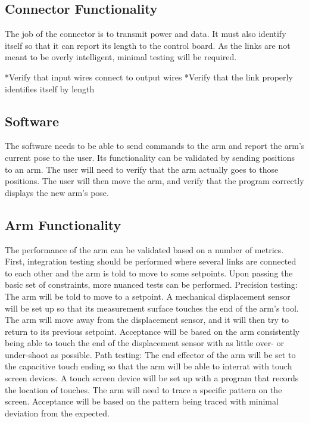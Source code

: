 \subsection{Connector Functionality}
The job of the connector is to transmit power and data. It must also identify itself so that it can report its length to the control board. As the links are not meant to be overly intelligent, minimal testing will be required. 

*Verify that input wires connect to output wires
*Verify that the link properly identifies itself by length
\subsection{Software}
The software needs to be able to send commands to the arm and report the arm's current pose to the user. Its functionality can be validated by sending positions to an arm. The user will need to verify that the arm actually goes to those positions. The user will then move the arm, and verify that the program correctly displays the new arm's pose.
\subsection{Arm Functionality}
The performance of the arm can be validated based on a number of metrics. First, integration testing should be performed where several links are connected to each other and the arm is told to move to some setpoints. Upon passing the basic set of constraints, more nuanced tests can be performed.
\newline * Precision testing: The arm will be told to move to a setpoint. A mechanical displacement sensor will be set up so that its measurement surface touches the end of the arm's tool. The arm will move away from the displacement sensor, and it will then try to return to its previous setpoint. Acceptance will be based on the arm consistently being able to touch the end of the displacement sensor with as little over- or under-shoot as possible.
\newline
\newline * Path testing: The end effector of the arm will be set to the capacitive touch ending so that the arm will be able to interrat with touch screen devices. A touch screen device will be set up with a program that records the location of touches. The arm will need to trace a specific pattern on the screen. Acceptance will be based on the pattern being traced with minimal deviation from the expected.